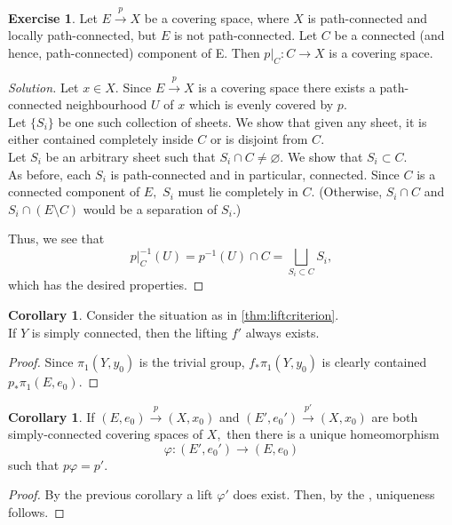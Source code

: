 \documentclass[12pt]{article}
\theoremstyle{definition}
\numberwithin{thm}{section}
\newtheorem{cor}[thm]{Corollary}
\newtheorem{exe}[thm]{Exercise}
\let\emptyset\varnothing
\newenvironment{soln}{\begin{proof}[Solution]}{\end{proof}}
\begin{document}
\begin{exe}
	Let $E\overset{p}{\longrightarrow}X$ be a covering space, where $X$ is path-connected and locally path-connected, but $E$ is not path-connected. Let $C$ be a connected (and hence, path-connected) component of E. Then $p|_C:C\to X$ is a covering space.
\end{exe}
\begin{soln}
	Let $x \in X.$ Since $E\overset{p}{\longrightarrow}X$ is a covering space there exists a path-connected neighbourhood $U$ of $x$ which is evenly covered by $p.$ \\
	Let $\{S_i\}$ be one such collection of sheets. We show that given any sheet, it is either contained completely inside $C$ or is disjoint from $C.$\\
	Let $S_i$ be an arbitrary sheet such that $S_i \cap C \neq \emptyset.$ We show that $S_i \subset C.$\\
	As before, each $S_i$ is path-connected and in particular, connected. Since $C$ is a connected component of $E,$ $S_i$ must lie completely in $C.$ (Otherwise, $S_i \cap C$ and $S_i \cap (E \setminus C)$ would be a separation of $S_i$.)

	Thus, we see that
	\begin{equation*} 
		p|_C^{-1}(U) = p^{-1}(U) \cap C = \bigsqcup_{S_i \subset C}S_i,
	\end{equation*}
	which has the desired properties.
\end{soln}

\begin{cor} \label{cor:liftexists}
	Consider the situation as in \cref{thm:liftcriterion}. \\
	If $Y$ is simply connected, then the lifting $f'$ always exists.
\end{cor}
\begin{proof} 
	Since $\pi_1(Y, y_0)$ is the trivial group, $f_*\pi_1(Y, y_0)$ is clearly contained $p_*\pi_1(E, e_0).$	
\end{proof}

\begin{cor} \label{cor:equivcoverings}
	If $(E, e_0) \overset{p}{\longrightarrow} (X, x_0)$ and $(E', e_0') \overset{p'}{\longrightarrow} (X, x_0)$ are both simply-connected covering spaces of $X,$ then there is a unique homeomorphism
	\begin{equation*} 
		\varphi:(E', e_0') \to (E, e_0)
	\end{equation*}
	such that $p\varphi = p'.$
\end{cor}
\begin{proof} 
	By the previous corollary a lift $\varphi'$ does exist. Then, by the , uniqueness follows.
\end{proof}
\end{document}
